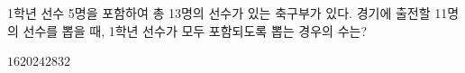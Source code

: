 \hspace*{2mm}\begin{minipage}[t]{\dimexpr\linewidth-2mm\relax}\vspace{0pt}
1학년 선수 5명을 포함하여 총 13명의 선수가 있는 축구부가 있다. 경기에 출전할 11명의 선수를 뽑을 때, 1학년 선수가 모두 포함되도록 뽑는 경우의 수는?
\begin{choices32}{$16$}{$20$}{$24$}{$28$}{$32$}\end{choices32}\end{minipage}
